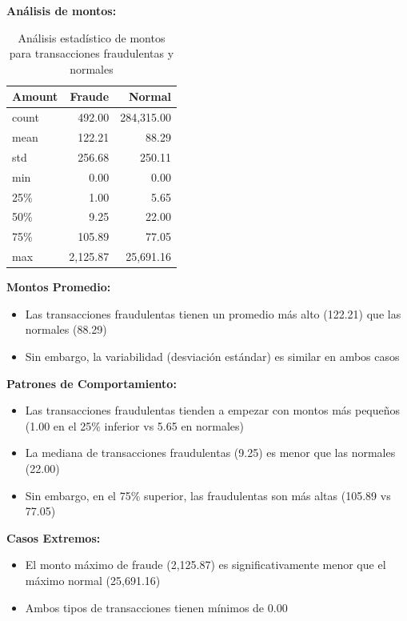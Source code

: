 \documentclass[9pt,a4paper,twoside]{rho-class/rho}
\begin{document}
        \textbf{Análisis de montos:}
        \begin{table}[h]
            \centering
            \begin{tabular}{lrr}
            \hline
            \textbf{Amount} & \textbf{Fraude} & \textbf{Normal} \\
            \hline
            count & 492.00 & 284,315.00 \\
            mean & 122.21 & 88.29 \\
            std & 256.68 & 250.11 \\
            min & 0.00 & 0.00 \\
            25\% & 1.00 & 5.65 \\
            50\% & 9.25 & 22.00 \\
            75\% & 105.89 & 77.05 \\
            max & 2,125.87 & 25,691.16 \\
            \hline
            \end{tabular}
            \caption{Análisis estadístico de montos para transacciones fraudulentas y normales}
        \end{table}

        \textbf{Montos Promedio:}
        \begin{itemize}
        \item Las transacciones fraudulentas tienen un promedio más alto (122.21) que las normales (88.29)
        \item Sin embargo, la variabilidad (desviación estándar) es similar en ambos casos
        \end{itemize}

        \textbf{Patrones de Comportamiento:}
        \begin{itemize}
        \item Las transacciones fraudulentas tienden a empezar con montos más pequeños (1.00 en el 25\% inferior vs 5.65 en normales)
        \item La mediana de transacciones fraudulentas (9.25) es menor que las normales (22.00)
        \item Sin embargo, en el 75\% superior, las fraudulentas son más altas (105.89 vs 77.05)
        \end{itemize}

        \textbf{Casos Extremos:}
        \begin{itemize}
        \item El monto máximo de fraude (2,125.87) es significativamente menor que el máximo normal (25,691.16)
        \item Ambos tipos de transacciones tienen mínimos de 0.00
        \end{itemize}
\end{document}
